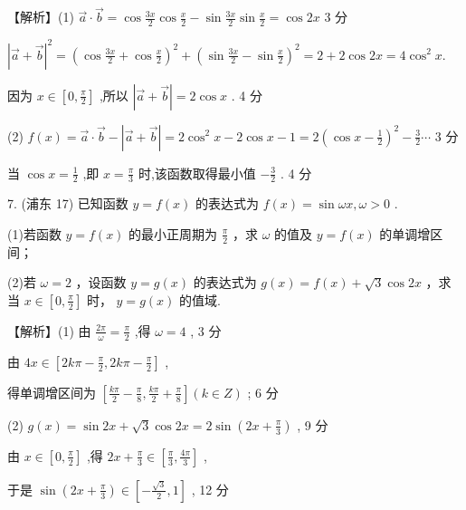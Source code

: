 \documentclass[10pt]{article}
\begin{document}
【解析】(1) \(\overrightarrow{a} \cdot  \overrightarrow{b} = \cos \frac{3x}{2}\cos \frac{x}{2} - \sin \frac{3x}{2}\sin \frac{x}{2} = \cos {2x}\) 3 分

\({\left| \overrightarrow{a} + \overrightarrow{b}\right| }^{2} = {\left( \cos \frac{3x}{2} + \cos \frac{x}{2}\right) }^{2} + {\left( \sin \frac{3x}{2} - \sin \frac{x}{2}\right) }^{2} = 2 + 2\cos {2x} = 4{\cos }^{2}x.\)

因为 \(x \in  \left\lbrack  {0,\frac{\pi }{2}}\right\rbrack\) ,所以 \(\left| {\overrightarrow{a} + \overrightarrow{b}}\right|  = 2\cos x\) . 4 分

(2) \(f\left( x\right)  = \overrightarrow{a} \cdot  \overrightarrow{b} - \left| {\overrightarrow{a} + \overrightarrow{b}}\right|  = 2{\cos }^{2}x - 2\cos x - 1 = 2{\left( \cos x - \frac{1}{2}\right) }^{2} - \frac{3}{2}\cdots\) 3 分

当 \(\cos x = \frac{1}{2}\) ,即 \(x = \frac{\pi }{3}\) 时,该函数取得最小值 \(- \frac{3}{2}\) . 4 分

7. (浦东 17) 已知函数 \(y = f\left( x\right)\) 的表达式为 \(f\left( x\right)  = \sin {\omega x},\omega  > 0\) .

(1)若函数 \(y = f\left( x\right)\) 的最小正周期为 \(\frac{\pi }{2}\) ，求 \(\omega\) 的值及 \(y = f\left( x\right)\) 的单调增区间；

(2)若 \(\omega  = 2\) ，设函数 \(y = g\left( x\right)\) 的表达式为 \(g\left( x\right)  = f\left( x\right)  + \sqrt{3}\cos {2x}\) ，求当 \(x \in  \left\lbrack  {0,\frac{\pi }{2}}\right\rbrack\) 时， \(y = g\left( x\right)\) 的值域.

【解析】(1) 由 \(\frac{2\pi }{\omega } = \frac{\pi }{2}\) ,得 \(\omega  = 4\) , 3 分

由 \({4x} \in  \left\lbrack  {{2k\pi } - \frac{\pi }{2},{2k\pi } - \frac{\pi }{2}}\right\rbrack\) ,

得单调增区间为 \(\left\lbrack  {\frac{k\pi }{2} - \frac{\pi }{8},\frac{k\pi }{2} + \frac{\pi }{8}}\right\rbrack  \left( {k \in  Z}\right)\) ; 6 分

(2) \(g\left( x\right)  = \sin {2x} + \sqrt{3}\cos {2x} = 2\sin \left( {{2x} + \frac{\pi }{3}}\right)\) , 9 分

由 \(x \in  \left\lbrack  {0,\frac{\pi }{2}}\right\rbrack\) ,得 \({2x} + \frac{\pi }{3} \in  \left\lbrack  {\frac{\pi }{3},\frac{4\pi }{3}}\right\rbrack\) ,

于是 \(\sin \left( {{2x} + \frac{\pi }{3}}\right)  \in  \left\lbrack  {-\frac{\sqrt{3}}{2},1}\right\rbrack\) , 12 分
\end{document}
